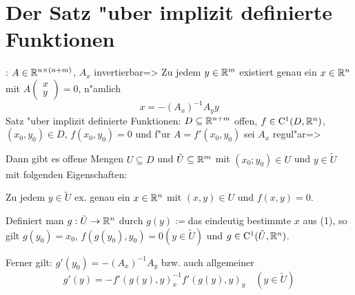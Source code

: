 \section{Der Satz "uber implizit definierte Funktionen}
\theorem:
  $A\in\mathbb R^{n\times(n+m)}$, $A_x$ invertierbar=>{
  Zu jedem $y\in\mathbb R^m$ existiert genau ein $x\in \mathbb R^n$ mit 
  $A\begin{pmatrix} x \\ y \end{pmatrix} = 0$, n"amlich
  \[x=-(A_x)^{-1} A_y y
    \]
  }
\theorem Satz "uber implizit definierte Funktionen:
  $D\subseteq\mathbb R^{n+m}$ offen, $f\in{\rm C}^1(D,\mathbb R^n)$, 
  $(x_0,y_0)\in D$, $f(x_0,y_0)=0$ und 
  f"ur $A=f'(x_0,y_0)$ sei $A_x$ regul"ar=>{ 
  Dann gibt es offene Mengen $U\subseteq D$ und $\tilde U\subseteq\mathbb R^m$
  mit $(x_0;y_0)\in U$ und $y\in\tilde U$ mit folgenden Eigenschaften:
  \begin{stmts}
    \item Zu jedem $y\in \tilde U$ ex. genau ein $x\in\mathbb R^n$ mit 
      $(x,y)\in U$ und $f(x,y)=0$.
    \item Definiert man $g:\tilde U\to\mathbb R^n$ durch $g(y):=$das eindeutig
      bestimmte $x$ aus (1), so gilt $g(y_0)=x_0$, $f(g(y_0),y_0)=0 (y\in\tilde U)$
      und $g\in{\rm C}^1(\tilde U,\mathbb R^n)$.
      
      Ferner gilt: $g'(y_0) = -(A_x)^{-1} A_y$ bzw. auch allgemeiner
      \[g'(y)=-f'(g(y),y)_x^{-1} f'(g(y),y)_y \quad(y\in \tilde U)
        \]
    \end{stmts}
  }
